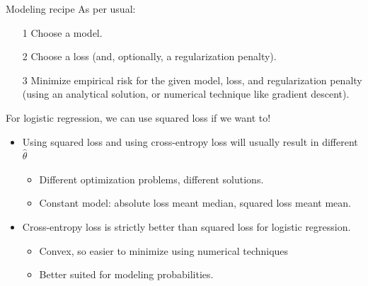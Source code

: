 \documentclass[aspectratio=169]{../latex_main/tntbeamer}  %
\begin{document}
	
	\begin{frame}[c]{Modeling recipe}
	    As per usual:
	    \begin{itemize}
	        \item[1]  Choose a model.
	        \item[2] Choose a loss (and, optionally, a regularization penalty).
	        \item[3] Minimize empirical risk for the given model, loss, and regularization penalty (using an analytical solution, or numerical technique like gradient descent).
	    \end{itemize}
	    For logistic regression, we can use squared loss if we want to!
	    \begin{itemize}
	        \item Using squared loss and using cross-entropy loss will usually result in different  $\hat{\theta}$
	        \begin{itemize}
	            \item Different optimization problems, different solutions.
	            \item  Constant model: absolute loss meant median, squared loss meant mean.
	        \end{itemize}
	        \item Cross-entropy loss is strictly better than squared loss for logistic regression.
	        \begin{itemize}
	            \item Convex, so easier to minimize using numerical techniques
	            \item Better suited for modeling probabilities.
	        \end{itemize}
	    \end{itemize}
	\end{frame}
\end{document}
